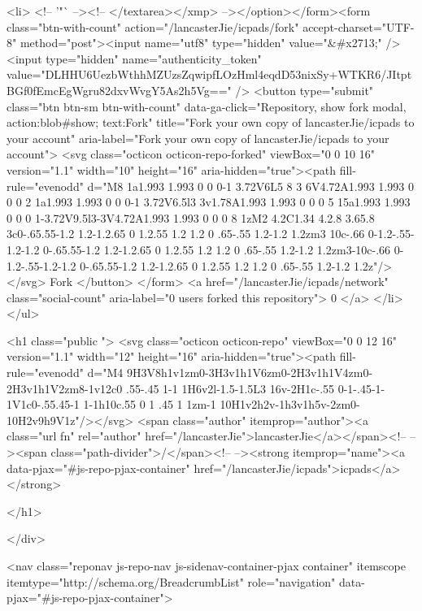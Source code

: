   <li>
          <!-- '"` --><!-- </textarea></xmp> --></option></form><form class="btn-with-count" action="/lancasterJie/icpads/fork" accept-charset="UTF-8" method="post"><input name="utf8" type="hidden" value="&#x2713;" /><input type="hidden" name="authenticity_token" value="DLHHU6UezbWthhMZUzsZqwipfLOzHml4eqdD53nixSy+WTKR6/JItptBGf0fEmcEgWgru82dxvWvgY5As2h5Vg==" />
            <button
                type="submit"
                class="btn btn-sm btn-with-count"
                data-ga-click="Repository, show fork modal, action:blob#show; text:Fork"
                title="Fork your own copy of lancasterJie/icpads to your account"
                aria-label="Fork your own copy of lancasterJie/icpads to your account">
              <svg class="octicon octicon-repo-forked" viewBox="0 0 10 16" version="1.1" width="10" height="16" aria-hidden="true"><path fill-rule="evenodd" d="M8 1a1.993 1.993 0 0 0-1 3.72V6L5 8 3 6V4.72A1.993 1.993 0 0 0 2 1a1.993 1.993 0 0 0-1 3.72V6.5l3 3v1.78A1.993 1.993 0 0 0 5 15a1.993 1.993 0 0 0 1-3.72V9.5l3-3V4.72A1.993 1.993 0 0 0 8 1zM2 4.2C1.34 4.2.8 3.65.8 3c0-.65.55-1.2 1.2-1.2.65 0 1.2.55 1.2 1.2 0 .65-.55 1.2-1.2 1.2zm3 10c-.66 0-1.2-.55-1.2-1.2 0-.65.55-1.2 1.2-1.2.65 0 1.2.55 1.2 1.2 0 .65-.55 1.2-1.2 1.2zm3-10c-.66 0-1.2-.55-1.2-1.2 0-.65.55-1.2 1.2-1.2.65 0 1.2.55 1.2 1.2 0 .65-.55 1.2-1.2 1.2z"/></svg>
              Fork
            </button>
</form>
    <a href="/lancasterJie/icpads/network" class="social-count"
       aria-label="0 users forked this repository">
      0
    </a>
  </li>
</ul>

      <h1 class="public ">
  <svg class="octicon octicon-repo" viewBox="0 0 12 16" version="1.1" width="12" height="16" aria-hidden="true"><path fill-rule="evenodd" d="M4 9H3V8h1v1zm0-3H3v1h1V6zm0-2H3v1h1V4zm0-2H3v1h1V2zm8-1v12c0 .55-.45 1-1 1H6v2l-1.5-1.5L3 16v-2H1c-.55 0-1-.45-1-1V1c0-.55.45-1 1-1h10c.55 0 1 .45 1 1zm-1 10H1v2h2v-1h3v1h5v-2zm0-10H2v9h9V1z"/></svg>
  <span class="author" itemprop="author"><a class="url fn" rel="author" href="/lancasterJie">lancasterJie</a></span><!--
--><span class="path-divider">/</span><!--
--><strong itemprop="name"><a data-pjax="#js-repo-pjax-container" href="/lancasterJie/icpads">icpads</a></strong>

</h1>

    </div>
    
<nav class="reponav js-repo-nav js-sidenav-container-pjax container"
     itemscope
     itemtype="http://schema.org/BreadcrumbList"
     role="navigation"
     data-pjax="#js-repo-pjax-container">

